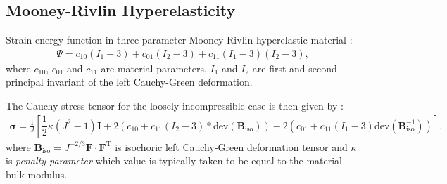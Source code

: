 \documentclass[review,3p]{elsarticle}
\newcommand{\bb}{\boldsymbol}
\begin{document}
\subsection{Mooney-Rivlin Hyperelasticity} 
\label{app:mechLaws:MR}
%
Strain-energy function in three-parameter Mooney-Rivlin hyperelastic material \cite{Rivlin1951}:
%
\begin{eqnarray}
	\Psi = c_{10}(I_1-3) + c_{01}(I_2-3) + c_{11}(I_1-3)(I_2-3),
\end{eqnarray}
%
where $c_{10}$, $c_{01}$ and $c_{11}$ are material parameters, $I_1$ and $I_2$ are first and second principal invariant of the left Cauchy-Green deformation.

The Cauchy stress tensor for the loosely incompressible case is then given by \cite{oliveira2020}:
\begin{eqnarray}
	\bb{\sigma} = \frac{1}{J} \left[ \dfrac{1}{2}\kappa(J^2-1)\bb{I} + 2(c_{10}+c_{11}(I_2-3)*\text{dev}(\bb{B}_{\mathrm{iso}})) -2(c_{01}+c_{11}(I_1-3)\text{dev}(\bb{B}_{\mathrm{iso}}^{-1}))\right].
\end{eqnarray}
where $\bb{B}_{\mathrm{iso}}=J^{-2/3}\bb{F}\cdot\bb{F}^{\mathrm{T}}$ is isochoric left Cauchy-Green deformation tensor and $\kappa$ is \emph{penalty parameter} which value is typically taken to be equal to the material bulk modulus.
%
%
\end{document}
